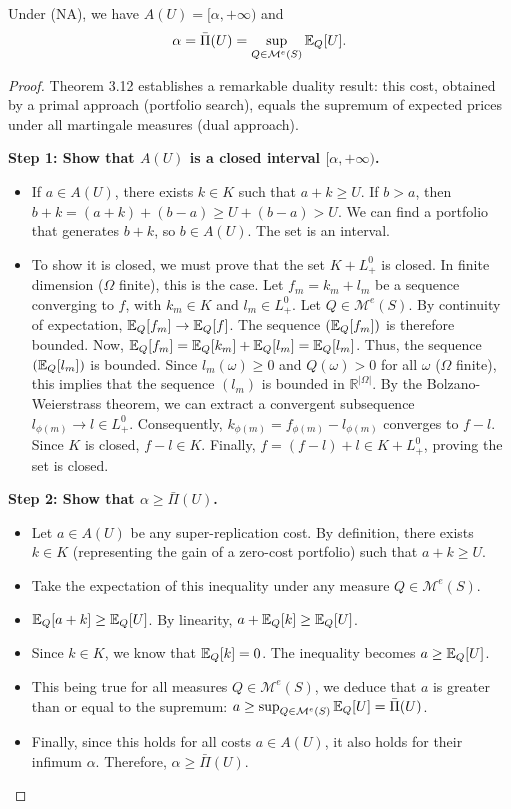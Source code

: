 \begin{theorem}\label{thm:superhedging_equals_upper_envelope}
Under (NA), we have $A(U)=[\alpha,+\infty)$ and
\begin{equation}
\alpha=\bar\Pi(U)=\sup_{Q\in\mathcal{M}^e(S)} \mathbb{E}_Q[U].
\end{equation}
\end{theorem}

\begin{proof}
Theorem 3.12 establishes a remarkable duality result: this cost, obtained by a primal approach (portfolio search), equals the supremum of expected prices under all martingale measures (dual approach).

\textbf{Step 1: Show that $A(U)$ is a closed interval $[\alpha, +\infty)$.}
\begin{itemize}
    \item If $a \in A(U)$, there exists $k \in K$ such that $a+k \ge U$. If $b > a$, then $b+k = (a+k) + (b-a) \ge U + (b-a) > U$. We can find a portfolio that generates $b+k$, so $b \in A(U)$. The set is an interval.
    \item To show it is closed, we must prove that the set $K + L^0_+$ is closed. In finite dimension ($\Omega$ finite), this is the case. Let $f_m = k_m + l_m$ be a sequence converging to $f$, with $k_m \in K$ and $l_m \in L^0_+$. Let $Q \in \mathcal{M}^e(S)$. By continuity of expectation, $\mathbb{E}_Q[f_m] \to \mathbb{E}_Q[f]$. The sequence $(\mathbb{E}_Q[f_m])$ is therefore bounded. Now, $\mathbb{E}_Q[f_m] = \mathbb{E}_Q[k_m] + \mathbb{E}_Q[l_m] = \mathbb{E}_Q[l_m]$. Thus, the sequence $(\mathbb{E}_Q[l_m])$ is bounded. Since $l_m(\omega) \ge 0$ and $Q(\omega) > 0$ for all $\omega$ ($\Omega$ finite), this implies that the sequence $(l_m)$ is bounded in $\mathbb{R}^{|\Omega|}$. By the Bolzano-Weierstrass theorem, we can extract a convergent subsequence $l_{\phi(m)} \to l \in L^0_+$. Consequently, $k_{\phi(m)} = f_{\phi(m)} - l_{\phi(m)}$ converges to $f-l$. Since $K$ is closed, $f-l \in K$. Finally, $f = (f-l) + l \in K + L^0_+$, proving the set is closed.
\end{itemize}

\textbf{Step 2: Show that $\alpha \ge \bar\Pi(U)$.}
\begin{itemize}
    \item Let $a \in A(U)$ be any super-replication cost. By definition, there exists $k \in K$ (representing the gain of a zero-cost portfolio) such that $a + k \ge U$.
    \item Take the expectation of this inequality under any measure $Q \in \mathcal{M}^e(S)$.
    \item $\mathbb{E}_Q[a + k] \ge \mathbb{E}_Q[U]$. By linearity, $a + \mathbb{E}_Q[k] \ge \mathbb{E}_Q[U]$.
    \item Since $k \in K$, we know that $\mathbb{E}_Q[k]=0$. The inequality becomes $a \ge \mathbb{E}_Q[U]$.
    \item This being true for all measures $Q \in \mathcal{M}^e(S)$, we deduce that $a$ is greater than or equal to the supremum: $a \ge \sup_{Q \in \mathcal{M}^e(S)} \mathbb{E}_Q[U] = \bar\Pi(U)$.
    \item Finally, since this holds for all costs $a \in A(U)$, it also holds for their infimum $\alpha$. Therefore, $\alpha \ge \bar\Pi(U)$.
\end{itemize}


\end{proof}
